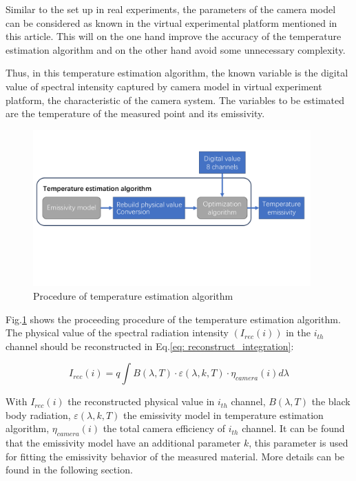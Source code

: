 Similar to the set up in real experiments, the parameters of the camera model can be 
considered as known in the virtual experimental platform mentioned in this article. 
This will on the one hand improve the accuracy of the temperature estimation algorithm
and on the other hand avoid some unnecessary complexity.


Thus, in this temperature estimation algorithm, the known variable is the digital value of 
spectral intensity captured by camera model in virtual experiment platform, the characteristic 
of the camera system. The variables to be estimated are the temperature of the measured point and 
its emissivity.


\begin{figure}[htbp]
    \centering
    \includegraphics[width=0.95\textwidth]{figures/temperature_esti_algorithm.pdf}
    \caption{Procedure of temperature estimation algorithm}
    \label{fig: temperature_estimation_algorithm}
\end{figure}


Fig.\ref{fig: temperature_estimation_algorithm} shows the proceeding procedure of the 
temperature estimation algorithm. The physical value of the spectral radiation intensity
$(I_{rec}(i))$ 
in the $i_{th}$ channel should be reconstructed in Eq.\ref{eq: reconstruct_integration}:

\begin{equation}
    \label{eq: reconstruct_integration}
    I_{rec}(i) = q \int B(\lambda, T) \cdot \varepsilon(\lambda, k, T) \cdot \eta_{camera}(i) d\lambda
\end{equation}

With $I_{rec}(i)$ the reconstructed physical value in $i_{th}$ channel, $B(\lambda, T)$ the black body radiation, 
$\varepsilon(\lambda, k, T)$ the emissivity model in temperature estimation algorithm, 
$\eta_{camera}(i)$ the total camera efficiency of $i_{th}$ channel. It can be found that 
the emissivity model have an additional parameter $k$, this parameter is used for fitting 
the emissivity behavior of the measured material. More details can be found in the following 
section.


